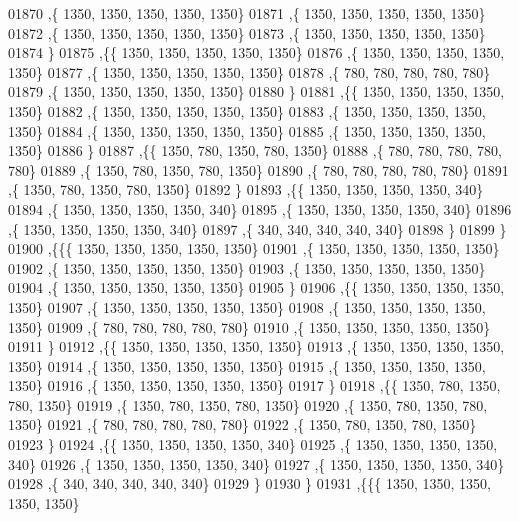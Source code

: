\begin{DoxyCode}
01870    ,\{  1350,  1350,  1350,  1350,  1350\}
01871    ,\{  1350,  1350,  1350,  1350,  1350\}
01872    ,\{  1350,  1350,  1350,  1350,  1350\}
01873    ,\{  1350,  1350,  1350,  1350,  1350\}
01874    \}
01875   ,\{\{  1350,  1350,  1350,  1350,  1350\}
01876    ,\{  1350,  1350,  1350,  1350,  1350\}
01877    ,\{  1350,  1350,  1350,  1350,  1350\}
01878    ,\{   780,   780,   780,   780,   780\}
01879    ,\{  1350,  1350,  1350,  1350,  1350\}
01880    \}
01881   ,\{\{  1350,  1350,  1350,  1350,  1350\}
01882    ,\{  1350,  1350,  1350,  1350,  1350\}
01883    ,\{  1350,  1350,  1350,  1350,  1350\}
01884    ,\{  1350,  1350,  1350,  1350,  1350\}
01885    ,\{  1350,  1350,  1350,  1350,  1350\}
01886    \}
01887   ,\{\{  1350,   780,  1350,   780,  1350\}
01888    ,\{   780,   780,   780,   780,   780\}
01889    ,\{  1350,   780,  1350,   780,  1350\}
01890    ,\{   780,   780,   780,   780,   780\}
01891    ,\{  1350,   780,  1350,   780,  1350\}
01892    \}
01893   ,\{\{  1350,  1350,  1350,  1350,   340\}
01894    ,\{  1350,  1350,  1350,  1350,   340\}
01895    ,\{  1350,  1350,  1350,  1350,   340\}
01896    ,\{  1350,  1350,  1350,  1350,   340\}
01897    ,\{   340,   340,   340,   340,   340\}
01898    \}
01899   \}
01900  ,\{\{\{  1350,  1350,  1350,  1350,  1350\}
01901    ,\{  1350,  1350,  1350,  1350,  1350\}
01902    ,\{  1350,  1350,  1350,  1350,  1350\}
01903    ,\{  1350,  1350,  1350,  1350,  1350\}
01904    ,\{  1350,  1350,  1350,  1350,  1350\}
01905    \}
01906   ,\{\{  1350,  1350,  1350,  1350,  1350\}
01907    ,\{  1350,  1350,  1350,  1350,  1350\}
01908    ,\{  1350,  1350,  1350,  1350,  1350\}
01909    ,\{   780,   780,   780,   780,   780\}
01910    ,\{  1350,  1350,  1350,  1350,  1350\}
01911    \}
01912   ,\{\{  1350,  1350,  1350,  1350,  1350\}
01913    ,\{  1350,  1350,  1350,  1350,  1350\}
01914    ,\{  1350,  1350,  1350,  1350,  1350\}
01915    ,\{  1350,  1350,  1350,  1350,  1350\}
01916    ,\{  1350,  1350,  1350,  1350,  1350\}
01917    \}
01918   ,\{\{  1350,   780,  1350,   780,  1350\}
01919    ,\{  1350,   780,  1350,   780,  1350\}
01920    ,\{  1350,   780,  1350,   780,  1350\}
01921    ,\{   780,   780,   780,   780,   780\}
01922    ,\{  1350,   780,  1350,   780,  1350\}
01923    \}
01924   ,\{\{  1350,  1350,  1350,  1350,   340\}
01925    ,\{  1350,  1350,  1350,  1350,   340\}
01926    ,\{  1350,  1350,  1350,  1350,   340\}
01927    ,\{  1350,  1350,  1350,  1350,   340\}
01928    ,\{   340,   340,   340,   340,   340\}
01929    \}
01930   \}
01931  ,\{\{\{  1350,  1350,  1350,  1350,  1350\}

\end{DoxyCode}
